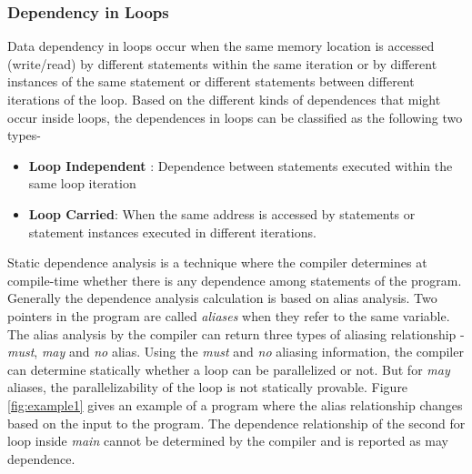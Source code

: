\documentclass[10pt]{report}          %
\begin{document}
\subsubsection{Dependency in Loops}

Data dependency in loops occur when the same memory location is accessed (write/read) by different statements within the same iteration or by different instances of the same statement or different statements between different iterations of the loop.  Based on the different kinds of dependences that might occur inside loops, the dependences in loops can be classified as the following two types- 

\begin{itemize}
\item \textbf{Loop Independent }: Dependence between statements executed within the same loop iteration
\item \textbf{Loop Carried}: When the same address is accessed by statements or statement instances executed in different iterations.
\end{itemize}

Static dependence analysis is a technique where the compiler determines at compile-time whether there is  any dependence among statements of the program.  Generally the dependence analysis calculation is based on alias analysis.  Two pointers in the program are called \textit{aliases} when they refer to the same variable.  The alias analysis by the compiler can return three types of aliasing relationship - \textit{must}, \textit{may} and \textit{no} alias.  Using the \textit{must} and \textit{no}  aliasing information, the compiler can determine statically whether a loop can be parallelized or not.  But for \textit{may} aliases, the parallelizability of the loop is not statically provable. Figure \ref{fig:example1} gives an example of a program where the alias relationship changes based on the input to the program.  The dependence relationship of the second for loop inside \textit{main} cannot be determined by the compiler and is reported as may dependence. \\
\end{document}
